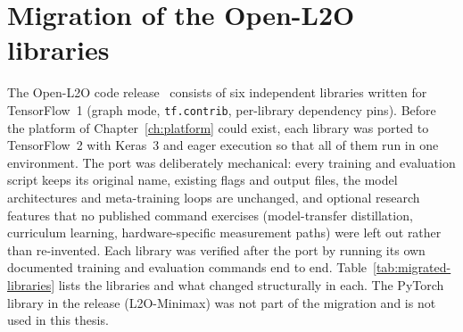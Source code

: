 \chapter{Migration of the Open-L2O libraries}
\label{app:migration}

The Open-L2O code release~\cite{chen2021primer} consists of six independent
libraries written for TensorFlow~1 (graph mode, \texttt{tf.contrib},
per-library dependency pins). Before the platform of Chapter~\ref{ch:platform}
could exist, each library was ported to TensorFlow~2 with Keras~3 and eager
execution so that all of them run in one environment. The port was
deliberately mechanical: every training and evaluation script keeps its
original name, existing flags and output files, the model architectures and
meta-training loops are unchanged, and optional research features that no
published command exercises (model-transfer distillation, curriculum
learning, hardware-specific measurement paths) were left out rather than
re-invented. Each library was verified after the port by running its own
documented training and evaluation commands end to end.
Table~\ref{tab:migrated-libraries} lists the libraries and what changed
structurally in each. The PyTorch library in the release (L2O-Minimax) was not
part of the migration and is not used in this thesis.

